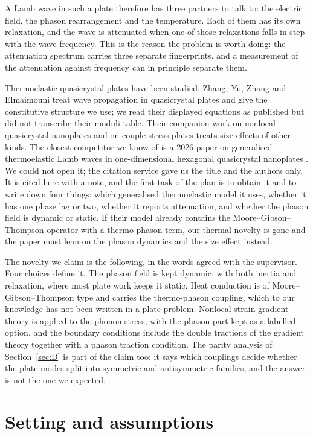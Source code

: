\documentclass[11pt,a4paper]{article}
\begin{document}
A Lamb wave in such a plate therefore has three partners to talk to: the electric field, the phason
rearrangement and the temperature. Each of them has its own relaxation, and the wave is attenuated when one
of those relaxations falls in step with the wave frequency. This is the reason the problem is worth doing:
the attenuation spectrum carries three separate fingerprints, and a measurement of the attenuation against
frequency can in principle separate them.

Thermoelastic quasicrystal plates have been studied. Zhang, Yu, Zhang and Elmaimouni
\cite{Zhang2021} treat wave propagation in quasicrystal plates and give the constitutive structure we use;
we read their displayed equations as published but did not transcribe their moduli table. Their companion
work on nonlocal quasicrystal nanoplates \cite{Wang2025} and on couple-stress plates \cite{Wang2022} treats
size effects of other kinds. The closest competitor we know of is a 2026 paper on generalised thermoelastic
Lamb waves in one-dimensional hexagonal quasicrystal nanoplates
\cite{ZhangSong2026}. We could not open it; the citation service gave us the title and the authors only. It
is cited here with a note, and the first task of the plan is to obtain it and to write down four things:
which generalised thermoelastic model it uses, whether it has one phase lag or two, whether it reports
attenuation, and whether the phason field is dynamic or static. If their model already contains the
Moore--Gibson--Thompson operator with a thermo-phason term, our thermal novelty is gone and the paper must
lean on the phason dynamics and the size effect instead.

The novelty we claim is the following, in the words agreed with the supervisor. Four choices define it.
The phason field is kept dynamic, with both inertia and relaxation, where most plate work keeps it static.
Heat conduction is of Moore--Gibson--Thompson type and carries the thermo-phason coupling, which to our
knowledge has not been written in a plate problem. Nonlocal strain gradient theory is applied to the phonon
stress, with the phason part kept as a labelled option, and the boundary conditions include the double
tractions of the gradient theory together with a phason traction condition. The parity analysis of
Section~\ref{sec:D} is part of the claim too: it says which couplings decide whether the plate modes split
into symmetric and antisymmetric families, and the answer is not the one we expected.

\section{Setting and assumptions}
\end{document}
